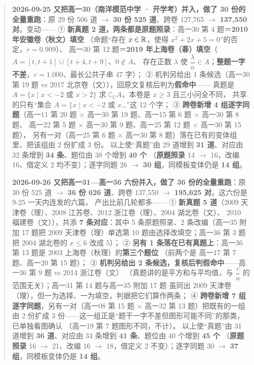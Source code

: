 \documentclass[a4paper,11pt]{article}
\begin{document}
\begin{quote}
\textbf{2026-09-25 又把高一30（南洋模范中学 · 开学考）并入，做了 30 份的全量重跑}：原 29 份 506 道 $\to$
\textbf{30 份 525 道}、跨卷 127,765 $\to$ \textbf{137,550 对}。变动------
① \textbf{新真题 2 道，两条都是原题照录}：高一30 第 4 题＝\textbf{2010 年安徽卷（秋文）填空}
（命题``存在 \(x\in\mathbb{R}\)，使得 \(x^2+2x+5=0\)''的否定，\(r=0.909\)）、
高一30 第 12 题＝\textbf{2019 年上海卷（春）填空}（\(A=[t,t+1]\cup[t+4,t+9]\)、\(0\notin A\)、
存在正数 \(\lambda\) 使 \(\dfrac\lambda a\in A\)；\textbf{整题一字不差}，\(r=1.000\)、最长公共子串 47 字）；
② 机判另给出 1 条候选（高一30 第 19 题 vs 2017 北京卷（文）），回原文复核后判为\textbf{假命中}------
真题是 \(A=\{x\mid x<-2\text{ 或 }x>2\}\) 求 \(\complement_U A\)，本卷是 \(x\geqslant3\) 且三小问全不同，
共享的只有``集合 \(A=\{x\mid x<-2\) 或 \(x\)\ldots''这 12 个字；
③ \textbf{跨卷新增 4 组逐字同题}（高一11 第 20 题 $\times$ 高一30 第 19 题、高一15 第 6 题 $\times$ 高一30 第 8 题、
高一22 第 5 题 $\times$ 高一30 第 9 题、高一25 第 12 题 $\times$ 高一30 第 15 题），
另有一对（高一25 第 6 题 $\times$ 高一30 第 8 题）落在已有的变体组里、把该组由 2 份扩成 3 份。
以上使``真题''由 29 道增到 \textbf{31 道}、对应由 32 条增到 \textbf{34 条}、题位由 38 个增到 \textbf{40 个}
（\textbf{原题照录} 14 $\to$ 16，改编 16、借定义 2 均不变）；逐字同题 26 $\to$ \textbf{30 组}，同模板变体仍是 \textbf{14 组}。

\textbf{2026-09-26 又把高一31---高一36 六份并入，做了 36 份的全量重跑}：原 30 份 525 道 $\to$
\textbf{36 份 626 道}、跨卷 137,550 $\to$ \textbf{195,625 对}。这六份是 9-25 一天内连发的六篇，
产出比前几轮都多------
① \textbf{新真题 5 道}（2009 天津卷（理）、2008 江苏卷、2012 浙江卷（理）、2004 湖北卷（文）、
2010 福建卷（文）），共添 \textbf{7 条对应}：其中 5 条原题照录、2 条改编（高一35 附加 17 题把
2009 天津卷（理）单选第 10 题由选择改填空；高一36 第 3 题把 2004 湖北卷的 \(x\leqslant6\) 改成 \(5\)）；
② \textbf{另有 1 条落在已有真题上}：高一36 第 13 题是 2003 上海卷（秋理）的\textbf{第三个题位}
（前两个是 高一17 第 7 题、高一20 第 15 题）；
③ \textbf{机判另给出 2 条候选，复核后判假命中}------高一36 第 9 题 vs 2014 浙江卷（文）
（真题讲的是平方和与平均值，与 \(\dfrac ca\) 的范围无关）；高一31 第 14 题与高一35 附加 17 题
虽同出 2009 天津卷（理），但一为选择、一为填空，判据把它们算作两条；
④ \textbf{跨卷新增 7 组逐字同题}，另有一对（高一08 第 15 题 $\times$ 高一32 第 13 题）把既有的一组
由 2 份扩成 3 份------这一组正是``题干一字不差但图形可能不同''的那类，已单独看图确认
（高一19 第 7 题图形不同，不计）。
以上使``真题''由 31 道增到 \textbf{36 道}、对应由 34 条增到 \textbf{41 条}、题位由 40 个增到 \textbf{45 个}
（\textbf{原题照录} 16 $\to$ 21、改编 16 $\to$ 18，借定义 2 不变）；逐字同题 30 $\to$ \textbf{37 组}，同模板变体仍是 \textbf{14 组}。


\end{quote}
\end{document}

